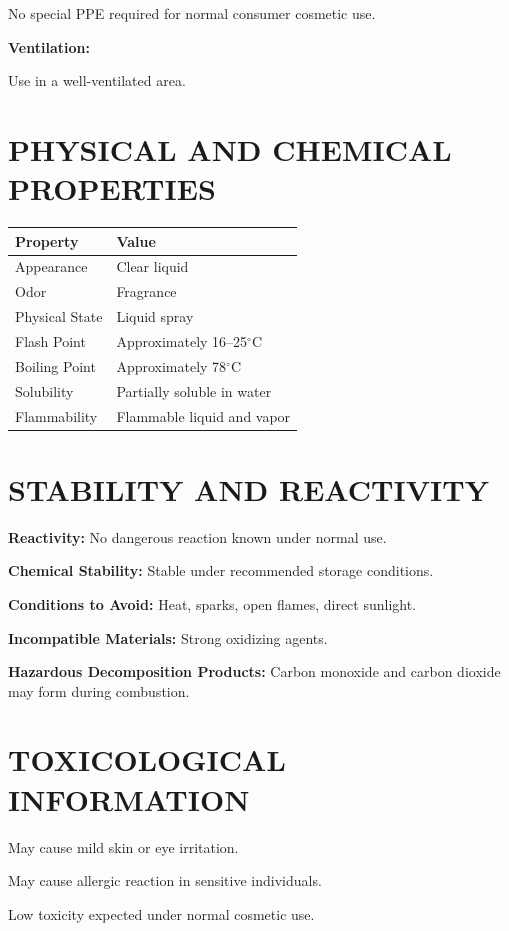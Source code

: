 \documentclass[11pt]{article}
\begin{document}
No special PPE required for normal consumer cosmetic use.

\textbf{Ventilation:}

Use in a well-ventilated area.

\section{PHYSICAL AND CHEMICAL PROPERTIES}

\begin{longtable}{|p{2.5in}|p{3in}|}
\hline
\textbf{Property} & \textbf{Value} \\
\hline
Appearance & Clear liquid \\
\hline
Odor & Fragrance \\
\hline
Physical State & Liquid spray \\
\hline
Flash Point & Approximately 16--25$^\circ$C \\
\hline
Boiling Point & Approximately 78$^\circ$C \\
\hline
Solubility & Partially soluble in water \\
\hline
Flammability & Flammable liquid and vapor \\
\hline
\end{longtable}

\section{STABILITY AND REACTIVITY}

\textbf{Reactivity:} No dangerous reaction known under normal use.

\textbf{Chemical Stability:} Stable under recommended storage conditions.

\textbf{Conditions to Avoid:} Heat, sparks, open flames, direct sunlight.

\textbf{Incompatible Materials:} Strong oxidizing agents.

\textbf{Hazardous Decomposition Products:} Carbon monoxide and carbon dioxide may form during combustion.

\section{TOXICOLOGICAL INFORMATION}

May cause mild skin or eye irritation.

May cause allergic reaction in sensitive individuals.

Low toxicity expected under normal cosmetic use.
\end{document}
